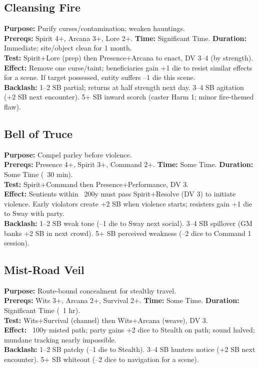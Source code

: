 \subsection*{Cleansing Fire}
\textbf{Purpose:} Purify curses/contamination; weaken hauntings.\\
\textbf{Prereqs:} Spirit 4+, Arcana 3+, Lore 2+. \quad \textbf{Time:} Significant Time. \quad \textbf{Duration:} Immediate; site/object clean for 1 month.\\
\textbf{Test:} Spirit+Lore (prep) then Presence+Arcana to enact, DV 3--4 (by strength).\\
\textbf{Effect:} Remove one curse/taint; beneficiaries gain +1 die to resist similar effects for a scene. If target possessed, entity suffers --1 die this scene.\\
\textbf{Backlash:} 1--2 SB partial; returns at half strength next day. 3--4 SB agitation (+2 SB next encounter). 5+ SB inward scorch (caster Harm 1; minor fire-themed flaw).

\subsection*{Bell of Truce}
\textbf{Purpose:} Compel parley before violence.\\
\textbf{Prereqs:} Presence 4+, Spirit 3+, Command 2+. \quad \textbf{Time:} Some Time. \quad \textbf{Duration:} Some Time (~30 min).\\
\textbf{Test:} Spirit+Command then Presence+Performance, DV 3.\\
\textbf{Effect:} Sentients within ~200y must pass Spirit+Resolve (DV 3) to initiate violence. Early violators create +2 SB when violence starts; resisters gain +1 die to Sway with party.\\
\textbf{Backlash:} 1--2 SB weak tone (--1 die to Sway next social). 3--4 SB spillover (GM banks +2 SB in next crowd). 5+ SB perceived weakness (--2 dice to Command 1 session).

\subsection*{Mist-Road Veil}
\textbf{Purpose:} Route-bound concealment for stealthy travel.\\
\textbf{Prereqs:} Wits 3+, Arcana 2+, Survival 2+. \quad \textbf{Time:} Some Time. \quad \textbf{Duration:} Significant Time (~1 hr).\\
\textbf{Test:} Wits+Survival (channel) then Wits+Arcana (weave), DV 3.\\
\textbf{Effect:} ~100y misted path; party gains +2 dice to Stealth on path; sound halved; mundane tracking nearly impossible.\\
\textbf{Backlash:} 1--2 SB patchy (--1 die to Stealth). 3--4 SB hunters notice (+2 SB next encounter). 5+ SB whiteout (--2 dice to navigation for a scene).

